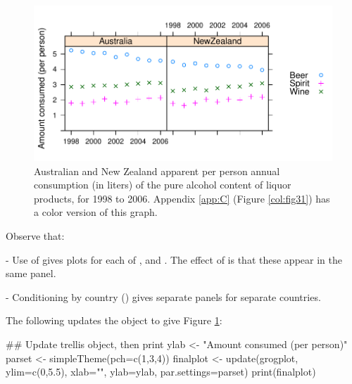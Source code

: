 \begin{figure}
\begin{Schunk}


\centerline{\includegraphics[width=\textwidth]{figs/09-grog-all-1} }

\end{Schunk}
\caption{Australian and New Zealand apparent per person annual
  consumption (in liters) of the pure alcohol content of liquor products, for
  1998 to 2006.  Appendix \ref{app:C} (Figure \ref{col:fig31}) has a color
version of this graph.\label{fig:allgrog}}
\end{figure}

Observe that:
\nopagebreak
\begin{itemizz}
\item[-] Use of  gives plots for each of
  ,  and .  The effect of
   is that these appear in the same panel.
\item[-] Conditioning by country () gives separate
  panels for separate countries.
\end{itemizz}

The following updates the object to give Figure \ref{fig:allgrog}:
\begin{Schunk}
\begin{Sinput}
## Update trellis object, then print
ylab <- "Amount consumed (per person)"
parset <- simpleTheme(pch=c(1,3,4))
finalplot <- update(grogplot, ylim=c(0,5.5),
                     xlab="", ylab=ylab,
                     par.settings=parset)
print(finalplot)
\end{Sinput}
\end{Schunk}


